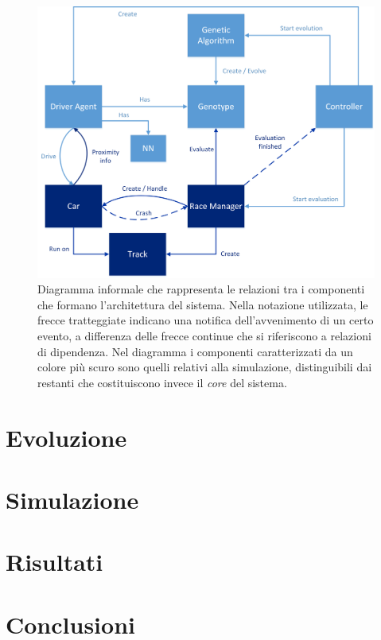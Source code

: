 \documentclass[a4paper,12pt]{article}
\begin{document}
\begin{figure}[H]
	\centering
	\includegraphics[width=130mm]{./img/architecture.png}
	\caption{Diagramma informale che rappresenta le relazioni tra i componenti che formano l'architettura del sistema. Nella notazione utilizzata, le frecce tratteggiate indicano una notifica dell'avvenimento di un certo evento, a differenza delle frecce continue che si riferiscono a relazioni di dipendenza. Nel diagramma i componenti caratterizzati da un colore più scuro sono quelli relativi alla simulazione, distinguibili dai restanti che costituiscono invece il \emph{core} del sistema.  \label{architecture-diagram}}
\end{figure}

\section{Evoluzione} \label{evolution}

\section{Simulazione} \label{simulation}

\section{Risultati}

\section{Conclusioni}
\end{document}
